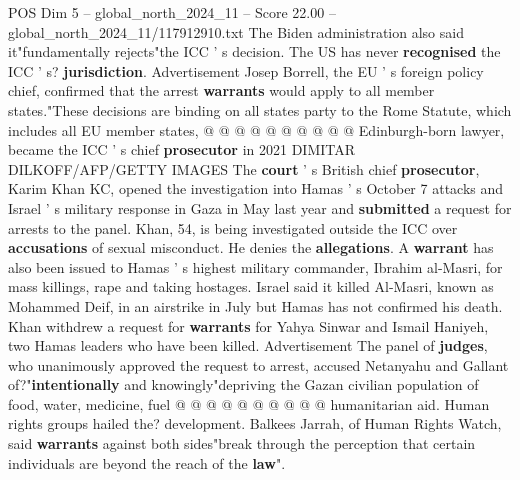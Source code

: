 \begin{textsample}{POS Dim 5 – global\_north\_2024\_11 – Score 22.00 – global\_north\_2024\_11/117912910.txt}
The Biden administration also said it"fundamentally rejects"the ICC ' s decision.
The US has never \textbf{recognised} the ICC ' s? \textbf{jurisdiction}.
Advertisement Josep Borrell, the EU ' s foreign policy chief, confirmed that the arrest \textbf{warrants} would apply to all member states."These decisions are binding on all states party to the Rome Statute, which includes all EU member states, @ @ @ @ @ @ @ @ @ @ Edinburgh-born lawyer, became the ICC ' s chief \textbf{prosecutor} in 2021 DIMITAR DILKOFF/AFP/GETTY IMAGES The \textbf{court} ' s British chief \textbf{prosecutor}, Karim Khan KC, opened the investigation into Hamas ' s October 7 attacks and Israel ' s military response in Gaza in May last year and \textbf{submitted} a request for arrests to the panel.
Khan, 54, is being investigated outside the ICC over \textbf{accusations} of sexual misconduct.
He denies the \textbf{allegations}.
A \textbf{warrant} has also been issued to Hamas ' s highest military commander, Ibrahim al-Masri, for mass killings, rape and taking hostages.
Israel said it killed Al-Masri, known as Mohammed Deif, in an airstrike in July but Hamas has not confirmed his death.
Khan withdrew a request for \textbf{warrants} for Yahya Sinwar and Ismail Haniyeh, two Hamas leaders who have been killed.
Advertisement The panel of \textbf{judges}, who unanimously approved the request to arrest, accused Netanyahu and Gallant of?"\textbf{intentionally} and knowingly"depriving the Gazan civilian population of food, water, medicine, fuel @ @ @ @ @ @ @ @ @ @ humanitarian aid.
Human rights groups hailed the? development.
Balkees Jarrah, of Human Rights Watch, said \textbf{warrants} against both sides"break through the perception that certain individuals are beyond the reach of the \textbf{law}".

\end{textsample}
